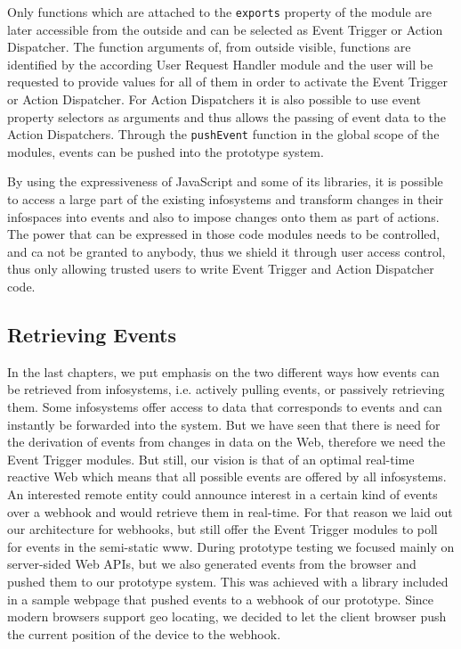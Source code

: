 Only functions which are attached to the \texttt{exports} property of the module are later accessible from the outside and can be selected as \textrm{Event Trigger} or \textrm{Action Dispatcher}.
The function arguments of, from outside visible, functions are identified by the according \textrm{User Request Handler} module and the user will be requested to provide values for all of them in order to activate the \textrm{Event Trigger} or \textrm{Action Dispatcher}.
For \textrm{Action Dispatchers} it is also possible to use event property selectors as arguments and thus allows the passing of event data to the \textrm{Action Dispatchers}.
Through the \texttt{pushEvent} function in the global scope of the modules, events can be pushed into the prototype system.

By using the expressiveness of \textrm{JavaScript} and some of its libraries, it is possible to access a large part of the existing \textrm{\glspl{infosystem}} and transform changes in their \textrm{\glspl{infospace}} into events and also to impose changes onto them as part of actions.
The power that can be expressed in those code modules needs to be controlled, and ca not be granted to anybody, thus we shield it through user access control, thus only allowing trusted users to write \textrm{Event Trigger} and \textrm{Action Dispatcher} code.



\subsection{Retrieving Events}
In the last chapters, we put emphasis on the two different ways how events can be retrieved from \textrm{\glspl{infosystem}}, i.e. actively pulling events, or passively retrieving them.
Some \textrm{\glspl{infosystem}} offer access to data that corresponds to events and can instantly be forwarded into the system.
But we have seen that there is need for the derivation of events from changes in data on the Web, therefore we need the \textrm{Event Trigger} modules.
But still, our vision is that of an optimal real-time reactive Web which means that all possible events are offered by all \textrm{\glspl{infosystem}}.
An interested remote entity could announce interest in a certain kind of events over a \textrm{\gls{webhook}} and would retrieve them in real-time.
For that reason we laid out our architecture for \textrm{\glspl{webhook}}, but still offer the \textrm{Event Trigger} modules to poll for events in the semi-static \textrm{\gls{www}}.
During prototype testing we focused mainly on server-sided \textrm{Web APIs}, but we also generated events from the browser and pushed them to our prototype system.
This was achieved with a library included in a sample webpage that pushed events to a \textrm{\gls{webhook}} of our prototype.
Since modern browsers support geo locating, we decided to let the client browser push the current position of the device to the \textrm{\gls{webhook}}.



